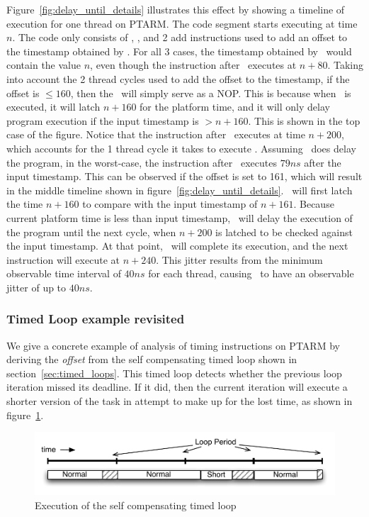 Figure~\ref{fig:delay_until_details} illustrates this effect by showing a timeline of execution for one thread on PTARM. 
The code segment starts executing at time $n$. 
The code only consists of \gettime, \delayuntil, and 2 add instructions used to add an offset to the timestamp obtained by \gettime.
For all 3 cases, the timestamp obtained by \gettime\ would contain the value $n$, even though the instruction after \gettime\ executes at $n+80$.
Taking into account the 2 thread cycles used to add the offset to the timestamp, if the offset is $\leq 160$, then the \delayuntil\ will simply serve as a NOP. 
This is because when \delayuntil\ is executed, it will latch $n+160$ for the platform time, and it will only delay program execution if the input timestamp is $> n+160$.
This is shown in the top case of the figure.
Notice that the instruction after \delayuntil\ executes at time $n+200$, which accounts for the 1 thread cycle it takes to execute \delayuntil.
Assuming \delayuntil\ does delay the program, in the worst-case, the instruction after \delayuntil\ executes $79 ns$ after the input timestamp. 
This can be observed if the offset is set to 161, which will result in the middle timeline shown in figure~\ref{fig:delay_until_details}.  
\Delayuntil\ will first latch the time $n+160$ to compare with the input timestamp of $n+161$. 
Because current platform time is less than input timestamp, \delayuntil\ will delay the execution of the program until the next cycle, when $n+200$ is latched to be checked against the input timestamp. 
At that point, \delayuntil\ will complete its execution, and the next instruction will execute at $n+240$.
This jitter results from the minimum observable time interval of $40 ns$ for each thread, causing \delayuntil\ to have an observable jitter of up to $40 ns$. 
\subsubsection{Timed Loop example revisited}
We give a concrete example of analysis of timing instructions on PTARM by deriving the \emph{offset} from the self compensating timed loop shown in section~\ref{sec:timed_loops}.
This timed loop detects whether the previous loop iteration missed its deadline. 
If it did, then the current iteration will execute a shorter version of the task in attempt to make up for the lost time, as shown in figure~\ref{fig:self_compensating_loop_timing}.  
\begin{figure}[h]
  \vspace{-3mm}
  \begin{center}
    \includegraphics[scale=.7]{figs/self_compensating_loop_timing}
  \end{center}
  \vspace{-10mm}
  \caption{Execution of the self compensating timed loop}
  \label{fig:self_compensating_loop_timing}
\end{figure}

